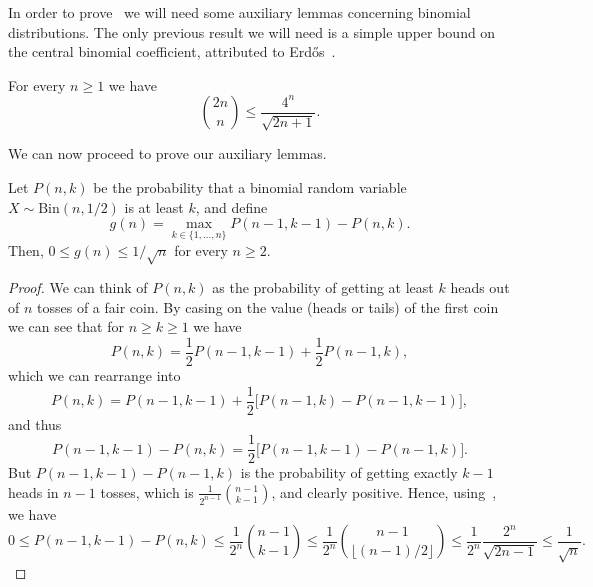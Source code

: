 In order to prove~ we will need some auxiliary lemmas concerning binomial distributions. The only previous result we will need is a simple upper bound on the central binomial coefficient, attributed to Erd\H{o}s~\citep{133742}.
\begin{lemma}
    For every $n \geq 1$ we have
    \[
    \binom{2n}{n} \leq \frac{4^n}{\sqrt{2n+1}}.
    \]
    \label{lemma:erdos}
\end{lemma}
We can now proceed to prove our auxiliary lemmas.
\begin{lemma}\label{lemma:p-diff}
Let $P(n, k)$ be the probability that a binomial random variable $X \sim \text{Bin}(n, 1/2)$ is at least $k$, and define 
\[
    g(n) = \max_{k \in \{1, \ldots, n\}} P(n-1, k-1) - P(n, k).
\]
Then, $0 \leq g(n) \leq 1/\sqrt{n}$ for every $n \geq 2$.
\end{lemma}
\begin{proof}
We can think of $P(n, k)$ as the probability of getting at least $k$ heads out of $n$ tosses of a fair coin. By casing on the value (heads or tails) of the first coin we can see that for $n \geq k \geq 1$ we have
\[ 
    P(n, k) = \frac{1}{2}P(n-1, k-1) + \frac{1}{2}P(n-1, k),
\]
which we can rearrange into 
\[ 
    P(n, k) = P(n-1, k-1) + \frac{1}{2}\big[P(n-1, k) - P(n-1, k-1)\big],
\]
and thus
\[ 
    P(n-1, k-1) - P(n, k) = \frac{1}{2}\big[P(n-1, k-1) - P(n-1, k)\big].
\]
But $P(n-1, k-1) - P(n-1, k)$ is the probability of getting exactly $k-1$ heads in $n-1$ tosses, which is $\frac{1}{2^{n-1}} \binom{n-1}{k-1}$, and clearly positive. Hence, using~, we have
\[ 
    0 \leq P(n-1, k-1) - P(n, k) \leq \frac{1}{2^{n}} \binom{n-1}{k-1} \leq \frac{1}{2^{n}} \binom{n-1}{\lfloor (n-1)/2 \rfloor} \leq \frac{1}{2^{n}} \frac{2^n}{\sqrt{ 2n - 1}} \leq \frac{1}{\sqrt{n}}. 
\]
\end{proof}

